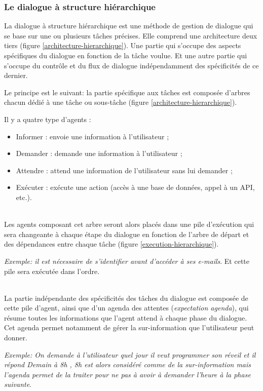 \subsubsection{Le dialogue à structure hiérarchique}
La dialogue à structure hiérarchique est une méthode de gestion de dialogue qui se base sur une ou plusieurs tâches précises. Elle comprend une architecture deux tiers (figure \ref{architecture-hierarchique}). Une partie qui s'occupe des aspects spécifiques du dialogue en fonction de la tâche voulue. Et une autre partie qui s'occupe du contrôle et du flux de dialogue indépendamment des spécificités de ce dernier. 

Le principe est le suivant: la partie spécifique aux tâches est composée d'arbres chacun dédié à une tâche ou sous-tâche (figure \ref{architecture-hierarchique}). 

Il y a quatre type d'agents :
\begin{itemize}
	\item Informer : envoie une information à l'utilisateur ;
	\item Demander : demande une information à l'utilisateur ;
	\item Attendre : attend une information de l'utilisateur sans lui demander ;
	\item Exécuter : exécute une action (accès à une base de données, appel à un API, etc.). 
\end{itemize} 

~\\\indent
Les agents composant cet arbre seront alors placés dans une pile d'exécution qui sera changeante à chaque étape du dialogue en fonction de l'arbre de départ et des dépendances entre chaque tâche (figure \ref{execution-hierarchique}). 

\textit{Exemple: il est nécessaire de s'identifier avant d'accéder à ses e-mails}. Et cette pile sera exécutée dans l'ordre.

~\\\indent
La partie indépendante des spécificités des tâches du dialogue est composée de cette pile d'agent, ainsi que d'un agenda des attentes (\textit{expectation agenda}), qui résume toutes les informations que l'agent attend à chaque phase du dialogue. Cet agenda permet notamment de gérer la sur-information que l'utilisateur peut donner. 

\textit{Exemple: On demande à l'utilisateur quel jour il veut programmer son réveil et il répond \og Demain à 8h \fg, 8h est alors considéré comme de la sur-information mais l'agenda permet de la traiter pour ne pas à avoir à demander l'heure à la phase suivante}.


